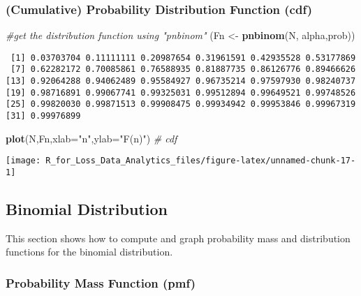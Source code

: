 \documentclass[]{book}
\newenvironment{Shaded}{\begin{snugshade}}{\end{snugshade}}
\newcommand{\KeywordTok}[1]{\textcolor[rgb]{0.13,0.29,0.53}{\textbf{#1}}}
\newcommand{\DataTypeTok}[1]{\textcolor[rgb]{0.13,0.29,0.53}{#1}}
\newcommand{\StringTok}[1]{\textcolor[rgb]{0.31,0.60,0.02}{#1}}
\newcommand{\CommentTok}[1]{\textcolor[rgb]{0.56,0.35,0.01}{\textit{#1}}}
\newcommand{\NormalTok}[1]{#1}
\theoremstyle{definition}
\theoremstyle{definition}
\theoremstyle{definition}
\theoremstyle{remark}
\begin{document}
\subsubsection{(Cumulative) Probability Distribution Function
(cdf)}\label{cumulative-probability-distribution-function-cdf-1}

\begin{Shaded}
\begin{Highlighting}[]
\CommentTok{#get the distribution function using "pnbinom"}
\NormalTok{(Fn <-}\StringTok{ }\KeywordTok{pnbinom}\NormalTok{(N, alpha,prob))}
\end{Highlighting}
\end{Shaded}

\begin{verbatim}
 [1] 0.03703704 0.11111111 0.20987654 0.31961591 0.42935528 0.53177869
 [7] 0.62282172 0.70085861 0.76588935 0.81887735 0.86126776 0.89466626
[13] 0.92064288 0.94062489 0.95584927 0.96735214 0.97597930 0.98240737
[19] 0.98716891 0.99067741 0.99325031 0.99512894 0.99649521 0.99748526
[25] 0.99820030 0.99871513 0.99908475 0.99934942 0.99953846 0.99967319
[31] 0.99976899
\end{verbatim}

\begin{Shaded}
\begin{Highlighting}[]
\KeywordTok{plot}\NormalTok{(N,Fn,}\DataTypeTok{xlab=}\StringTok{"n"}\NormalTok{,}\DataTypeTok{ylab=}\StringTok{"F(n)"}\NormalTok{) }\CommentTok{# cdf}
\end{Highlighting}
\end{Shaded}

\begin{center}\texttt{[image: R\_for\_Loss\_Data\_Analytics\_files/figure-latex/unnamed-chunk-17-1]} \end{center}

\subsection{Binomial Distribution}\label{binomial-distribution}

This section shows how to compute and graph probability mass and
distribution functions for the binomial distribution.

\subsubsection{Probability Mass Function
(pmf)}\label{probability-mass-function-pmf-2}
\end{document}

